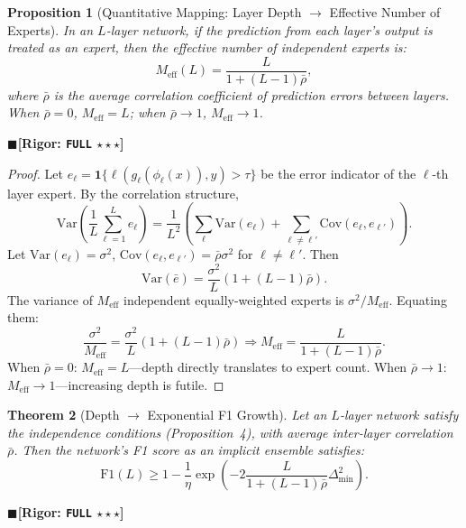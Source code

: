 \documentclass[12pt,a4paper]{article}
\newtheorem{theorem}{Theorem}[section]
\newtheorem{proposition}[theorem]{Proposition}
\theoremstyle{definition}
\theoremstyle{remark}
\newcommand{\rigorFull}{$\blacksquare$\;\textbf{[Rigor: \texttt{FULL} $\star\star\star$]}}
\begin{document}
\begin{proposition}[Quantitative Mapping: Layer Depth $\to$ Effective Number of Experts]
\label{prop:5}
In an $L$-layer network, if the prediction from each layer's output is treated as an expert, then the effective number of independent experts is:
\begin{equation}
M_{\text{eff}}(L) = \frac{L}{1 + (L-1)\bar{\rho}},
\end{equation}
where $\bar{\rho}$ is the average correlation coefficient of prediction errors between layers. When $\bar{\rho} = 0$, $M_{\text{eff}} = L$; when $\bar{\rho} \to 1$, $M_{\text{eff}} \to 1$.
\end{proposition}
\rigorFull

\begin{proof}
Let $e_\ell = \mathbf{1}\{\ell(g_\ell(\phi_\ell(x)), y) > \tau\}$ be the error indicator of the $\ell$-th layer expert. By the correlation structure,
\begin{equation}
\mathrm{Var}\left(\frac{1}{L}\sum_{\ell=1}^L e_\ell\right) = \frac{1}{L^2}\left(\sum_\ell \mathrm{Var}(e_\ell) + \sum_{\ell \neq \ell'} \mathrm{Cov}(e_\ell, e_{\ell'})\right).
\end{equation}
Let $\mathrm{Var}(e_\ell) = \sigma^2$, $\mathrm{Cov}(e_\ell, e_{\ell'}) = \bar{\rho}\sigma^2$ for $\ell \neq \ell'$. Then
\begin{equation}
\mathrm{Var}(\bar{e}) = \frac{\sigma^2}{L}(1 + (L-1)\bar{\rho}).
\end{equation}
The variance of $M_{\text{eff}}$ independent equally-weighted experts is $\sigma^2/M_{\text{eff}}$. Equating them:
\begin{equation}
\frac{\sigma^2}{M_{\text{eff}}} = \frac{\sigma^2}{L}(1 + (L-1)\bar{\rho}) \Rightarrow M_{\text{eff}} = \frac{L}{1 + (L-1)\bar{\rho}}.
\end{equation}
When $\bar{\rho} = 0$: $M_{\text{eff}} = L$---depth directly translates to expert count. When $\bar{\rho} \to 1$: $M_{\text{eff}} \to 1$---increasing depth is futile.
\end{proof}

\begin{theorem}[Depth $\to$ Exponential F1 Growth]
\label{thm:3.1}
Let an $L$-layer network satisfy the independence conditions (Proposition~4), with average inter-layer correlation $\bar{\rho}$. Then the network's F1 score as an implicit ensemble satisfies:
\begin{equation}
\boxed{\mathrm{F1}(L) \geq 1 - \frac{1}{\eta}\exp\left(-2\frac{L}{1 + (L-1)\bar{\rho}}\Delta_{\min}^2\right)}.
\end{equation}
\end{theorem}
\rigorFull
\end{document}
